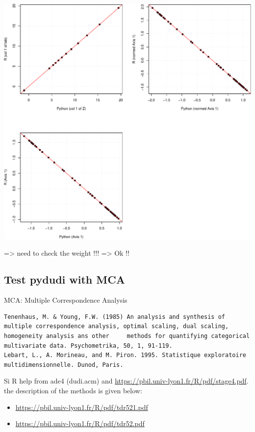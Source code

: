 \documentclass[
  10pt,
]{article}
\providecommand{\tightlist}{%
  \setlength{\itemsep}{0pt}\setlength{\parskip}{0pt}}
\begin{document}
\includegraphics{RandPytonAnalysisPDF_files/figure-latex/unnamed-chunk-29-1.pdf}

=\textgreater{} need to check the weight !!! =\textgreater{} Ok !!

\hypertarget{test-pydudi-with-mca}{%
\subsection{Test pydudi with MCA}\label{test-pydudi-with-mca}}

MCA: Multiple Correspondence Analysis

\begin{verbatim}
Tenenhaus, M. & Young, F.W. (1985) An analysis and synthesis of multiple correspondence analysis, optimal scaling, dual scaling, homogeneity analysis ans other     methods for quantifying categorical multivariate data. Psychometrika, 50, 1, 91-119.
Lebart, L., A. Morineau, and M. Piron. 1995. Statistique exploratoire multidimensionnelle. Dunod, Paris.
\end{verbatim}

Si R help from ade4 (dudi.acm) and
\url{https://pbil.univ-lyon1.fr/R/pdf/stage4.pdf}. the description of
the methods is given below:

\begin{itemize}
\tightlist
\item
  \url{https://pbil.univ-lyon1.fr/R/pdf/tdr521.pdf}
\item
  \url{https://pbil.univ-lyon1.fr/R/pdf/tdr52.pdf}
\end{itemize}
\end{document}
